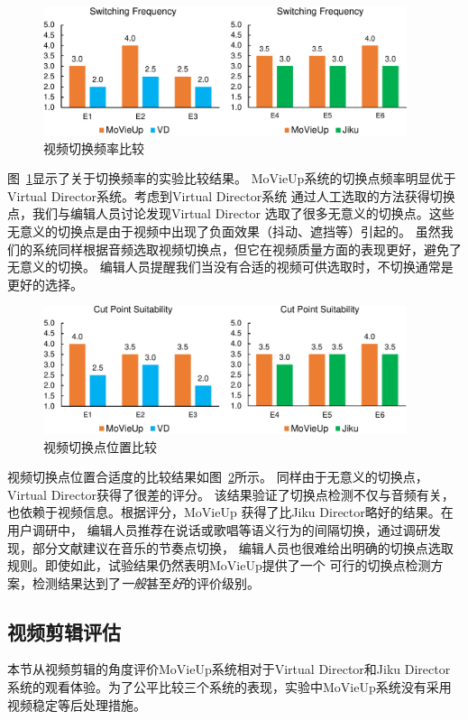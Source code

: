 \documentclass[doctor]{ustcthesis}
\begin{document}
\begin{figure}[ht]
    \centering
    \includegraphics[clip=true, width=0.95\textwidth]{mashup-eval-switching-frequency.pdf}
    \caption{视频切换频率比较}
    \label{fig:mashup-eval-switching-frequency}
\end{figure}
图~\ref{fig:mashup-eval-switching-frequency}显示了关于切换频率的实验比较结果。
MoVieUp系统的切换点频率明显优于Virtual Director系统。考虑到Virtual Director系统
通过人工选取的方法获得切换点，我们与编辑人员讨论发现Virtual Director
选取了很多无意义的切换点。这些无意义的切换点是由于视频中出现了负面效果（抖动、遮挡等）引起的。
虽然我们的系统同样根据音频选取视频切换点，但它在视频质量方面的表现更好，避免了无意义的切换。
编辑人员提醒我们当没有合适的视频可供选取时，不切换通常是更好的选择。

\begin{figure}[ht]
    \centering
    \includegraphics[clip=true, width=0.95\textwidth]{mashup-eval-cutpoint.pdf}
    \caption{视频切换点位置比较}
    \label{fig:mashup-eval-cutpoint}
\end{figure}
视频切换点位置合适度的比较结果如图~\ref{fig:mashup-eval-cutpoint}所示。
同样由于无意义的切换点，Virtual Director获得了很差的评分。
该结果验证了切换点检测不仅与音频有关，也依赖于视频信息。根据评分，MoVieUp
获得了比Jiku Director略好的结果。在用户调研中，
编辑人员推荐在说话或歌唱等语义行为的间隔切换，通过调研发现，部分文献建议在音乐的节奏点切换，
编辑人员也很难给出明确的切换点选取规则。即使如此，试验结果仍然表明MoVieUp提供了一个
可行的切换点检测方案，检测结果达到了\emph{一般}甚至\emph{好}的评价级别。

\subsection{视频剪辑评估}
本节从视频剪辑的角度评价MoVieUp系统相对于Virtual Director和Jiku Director
系统的观看体验。为了公平比较三个系统的表现，实验中MoVieUp系统没有采用视频稳定等后处理措施。
\end{document}

